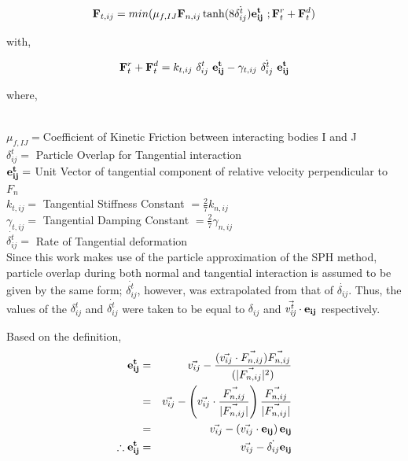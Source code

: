 \begin{eqnarray}
 {\bf{F}}_{t,ij} = min(\mu_{f,IJ} {\bf{F}}_{n,ij}\tanh(8\dot{\delta^t_{ij}}){\bf{e^t_{ij}}}~; {\bf{F}}_t^r + {\bf{F}}_t^d)
\end{eqnarray}

\hspace{3.15cm}with,

\begin{eqnarray}
 {\bf{F}}_t^r + {\bf{F}}_t^d = k_{t,ij}~\delta^t_{ij}~{\bf{e^t_{ij}}} - \gamma _{t,ij} ~ \dot{\delta ^t_{ij}}~\bf{e^t_{ij}}
\end{eqnarray}

{\raggedright{where,}}\\
$\mu_{f,IJ} = $Coefficient of Kinetic Friction between interacting bodies I and J\\
$\delta^t_{ij} = $ Particle Overlap for Tangential interaction \\
${\bf{e^t_{ij}}} = $ Unit Vector of tangential component of relative velocity perpendicular to $F_n$\cite{vetsch}\\
$k_{t,ij} = $ Tangential Stiffness Constant $= \frac{2}{7} k_{n,ij}$ \cite{hooman}\\
$\gamma_{t,ij} = $ Tangential Damping Constant $=\frac{2}{7} \gamma_{n,ij}$\cite{canelas_thesis}\\
$\dot{\delta ^t_{ij}} = $ Rate of Tangential deformation \\

Since this work makes use of the particle approximation of the SPH method, particle overlap during both normal and tangential interaction is assumed to be given by the same form; $\dot{\delta ^t_{ij}}$, however, was extrapolated from that of $\dot{\delta _{ij}}$. Thus, the values of the  $\delta^t_{ij}$ and $\dot{\delta ^t_{ij}}$ were taken to be equal to $\delta_{ij}$ and $ \vec{\it{v^t_{ij}}}\cdot {\bf{e_{ij}}}$ respectively. 

Based on the definition, 
\begin{eqnarray}
 {\bf{e^t_{ij}}}            &=& \vec{v_{ij}} - \frac{(\vec{v_{ij}} \cdot \vec{F_{n,ij}}) \vec{F_{n,ij}}}{(|\vec{F_{n,ij}}|^2)} \nonumber\\
                            &=& \vec{v_{ij}} - \left(\vec{v_{ij}}\cdot\frac{\vec{F_{n,ij}}}{|\vec{F_{n,ij}}|}\right)\frac{\vec{F_{n,ij}}}{|\vec{F_{n,ij}}|} \nonumber\\
                            &=& \vec{v_{ij}} - \left(\vec{v_{ij}}\cdot{\bf{e_{ij}}}\right){\bf{e_{ij}}}\nonumber\\
 \therefore {\bf{e^t_{ij}}} &=& \vec{v_{ij}} - \dot{\delta_{ij}}{\bf{e_{ij}}}\nonumber
\end{eqnarray}



